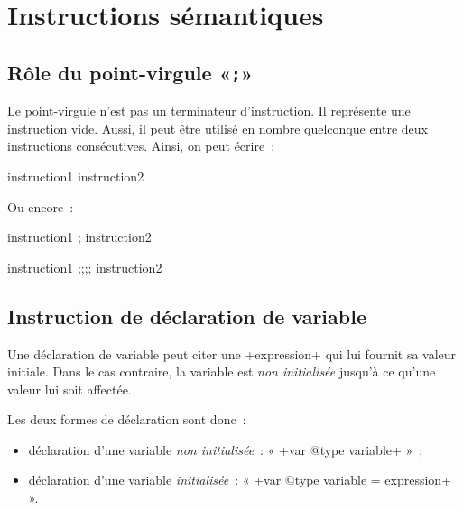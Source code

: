 
\chapter{Instructions sémantiques}






\section{Rôle du point-virgule «\texttt{;}»}

Le point-virgule n'est pas un terminateur d'instruction. Il représente une instruction vide. Aussi, il peut être utilisé en nombre quelconque entre deux instructions consécutives. Ainsi, on peut écrire~:

\begin{galgas}
instruction1  instruction2
\end{galgas}

Ou encore~:
\begin{galgas}
instruction1 ; instruction2
\end{galgas}
\begin{galgas}
instruction1 ;;;; instruction2
\end{galgas}







\section{Instruction de déclaration de variable}


Une déclaration de variable peut citer une \ggs+expression+ qui lui fournit sa valeur initiale. Dans le cas contraire, la variable est \emph{non initialisée} jusqu'à ce qu'une valeur lui soit affectée.

Les deux formes de déclaration sont donc~:
\begin{itemize}
\item déclaration d'une variable \emph{non initialisée}~: « \ggs+var @type variable+ »~;
\item déclaration d'une variable \emph{initialisée}~: « \ggs+var @type variable = expression+ ».
\end{itemize}


